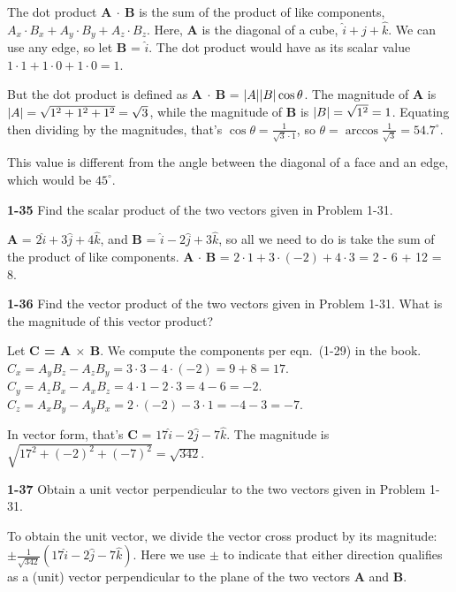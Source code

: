 \documentclass{amsart}
\begin{document}
The dot product \textbf{A $\cdot$ B} is the sum of the product of like components,
$A_x \cdot B_x + A_y \cdot B_y + A_z \cdot B_z$.
Here, \textbf{A} is the diagonal of a cube, $\hat i + \hat j + \hat k$.
We can use any edge, so let \textbf{B} = $\hat i$.
The dot product would have as its scalar value $1 \cdot 1 + 1 \cdot 0 + 1 \cdot 0 = 1$.

But the dot product is defined as \textbf{A $\cdot$ B} = $\abs{A} \abs {B} \cos \theta$.
The magnitude of \textbf{A} is $\abs{A} = \sqrt{1^2 + 1^2 + 1^2} = \sqrt{3}$,
while the magnitude of \textbf{B} is $\abs{B} = \sqrt{1^2} = 1$.
Equating then dividing by the magnitudes, that's $\cos \theta = \frac{1}{\sqrt{3} \cdot 1}$,
so $\theta = \arccos \frac{1}{\sqrt{3}} = 54.7^\circ$.

This value is different from the angle between the diagonal of a face and an edge,
which would be $45^\circ$.

\vspace{\baselineskip}

\noindent
\textbf{1-35} Find the scalar product of the two vectors given in Problem 1-31.

\textbf{A} = $2 \hat i + 3 \hat j + 4 \hat k$, and \textbf{B} = $\hat i - 2 \hat j + 3 \hat k$,
so all we need to do is take the sum of the product of like components.
\textbf{A} $\cdot$ \textbf{B} = $2 \cdot 1 + 3 \cdot (-2) + 4 \cdot 3$ = 2 - 6 + 12 = 8.

\vspace{\baselineskip}

\noindent
\textbf{1-36} Find the vector product of the two vectors given in Problem 1-31.
What is the magnitude of this vector product?

Let \textbf{C = A $\times$ B}.  We compute the components per eqn.\ (1-29) in the book.
$C_x = A_y B_z - A_z B_y = 3 \cdot 3 - 4 \cdot (-2) = 9 + 8 = 17$.
$C_y = A_z B_x - A_x B_z = 4 \cdot 1 - 2 \cdot 3 = 4 - 6 = -2$.
$C_z = A_x B_y - A_y B_x = 2 \cdot (-2) - 3 \cdot 1 = -4 - 3 = -7$.

In vector form, that's \textbf{C} = $17 \hat i -2 \hat j -7 \hat k$.
The magnitude is $\sqrt{17^2 + (-2)^2 + (-7)^2} = \sqrt{342}$.

\vspace{\baselineskip}

\noindent
\textbf{1-37} Obtain a unit vector perpendicular to the two vectors given in Problem 1-31.

To obtain the unit vector, we divide the vector cross product by its magnitude:
$\pm \frac{1}{\sqrt{342}} (17 \hat i -2 \hat j -7 \hat k)$.
Here we use $\pm$ to indicate that either direction qualifies as a (unit) vector
perpendicular to the plane of the two vectors \textbf{A} and \textbf{B}.
\end{document}
